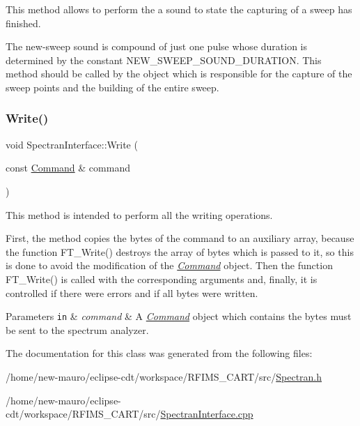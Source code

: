 This method allows to perform the a sound to state the capturing of a sweep has finished. 

The new-\/sweep sound is compound of just one pulse whose duration is determined by the constant N\+E\+W\+\_\+\+S\+W\+E\+E\+P\+\_\+\+S\+O\+U\+N\+D\+\_\+\+D\+U\+R\+A\+T\+I\+ON. This method should be called by the object which is responsible for the capture of the sweep points and the building of the entire sweep. \mbox{\label{classSpectranInterface_a3046fce691a5ed248e3fd647b0b043e8}} 
\subsubsection{\texorpdfstring{Write()}{Write()}}
{\footnotesize\ttfamily void Spectran\+Interface\+::\+Write (\begin{DoxyParamCaption}\item[{const \hyperlink{classCommand}{Command} \&}]{command }\end{DoxyParamCaption})\hspace{0.3cm}{\ttfamily [inline]}}



This method is intended to perform all the writing operations. 

First, the method copies the bytes of the command to an auxiliary array, because the function {\ttfamily F\+T\+\_\+\+Write()} destroys the array of bytes which is passed to it, so this is done to avoid the modification of the {\itshape \hyperlink{classCommand}{Command}} object. Then the function {\ttfamily F\+T\+\_\+\+Write()} is called with the corresponding arguments and, finally, it is controlled if there were errors and if all bytes were written. 
\begin{DoxyParams}[1]{Parameters}
\mbox{\tt in}  & {\em command} & A {\itshape \hyperlink{classCommand}{Command}} object which contains the bytes must be sent to the spectrum analyzer. \\
\hline
\end{DoxyParams}


The documentation for this class was generated from the following files\+:\begin{DoxyCompactItemize}
\item 
/home/new-\/mauro/eclipse-\/cdt/workspace/\+R\+F\+I\+M\+S\+\_\+\+C\+A\+R\+T/src/\hyperlink{Spectran_8h}{Spectran.\+h}\item 
/home/new-\/mauro/eclipse-\/cdt/workspace/\+R\+F\+I\+M\+S\+\_\+\+C\+A\+R\+T/src/\hyperlink{SpectranInterface_8cpp}{Spectran\+Interface.\+cpp}\end{DoxyCompactItemize}
